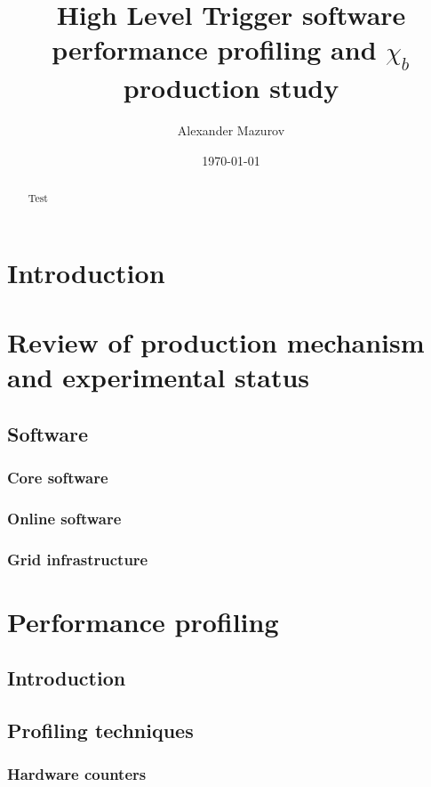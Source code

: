 \documentclass[12pt,a4paper]{article}
\begin{document}
\thispagestyle{fancyplain}
\title{High Level Trigger software performance profiling and $\chi_{b}$ production study}
\author{Alexander Mazurov}
\date{\today}
\maketitle
\begin{abstract}
Test
\end{abstract}



\section{Introduction}

\section{Review of production mechanism and experimental status}



\subsection{Software}
\subsubsection{Core software}
\subsubsection{Online software}
\subsubsection{Grid infrastructure}

\section{Performance profiling}
\subsection{Introduction}
\subsection{Profiling techniques}
\subsubsection{Hardware counters}
\end{document}

